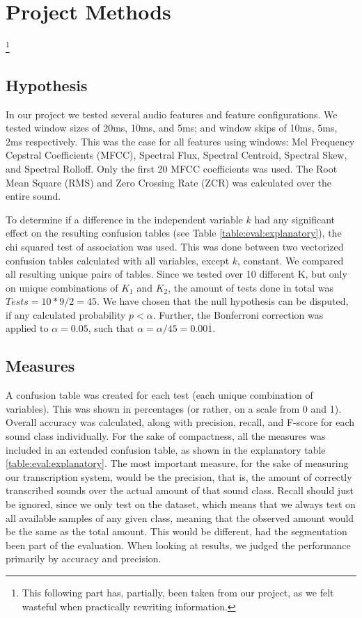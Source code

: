 
\section{Project Methods}\footnote{This following part has, partially, been taken from our project, as we felt wasteful when practically rewriting information.}
	\subsection{Hypothesis}
		In our project we tested several audio features and feature configurations.
		We tested window sizes of 20ms, 10ms, and 5ms; and window skips of 10ms, 5ms, 2ms respectively. This was the case for all features using windows: Mel Frequency Cepstral Coefficients (MFCC), Spectral Flux, Spectral Centroid, Spectral Skew, and Spectral Rolloff. Only the first 20 MFCC coefficients was used. The Root Mean Square (RMS) and Zero Crossing Rate (ZCR) was calculated over the entire sound.
		
		To determine if a difference in the independent variable $k$ had any significant effect on the resulting confusion tables (see Table \ref{table:eval:explanatory}), the chi squared test of association was used. This was done between two vectorized confusion tables calculated with all variables, except $k$, constant. We compared all resulting unique pairs of tables. Since we tested over 10 different K, but only on unique combinations of $K_1$ and $K_2$, the amount of tests done in total was $Tests = 10*9/2 = 45$. We have chosen that the null hypothesis can be disputed, if any calculated probability $p < \alpha$. Further, the Bonferroni correction\citep{bonferroni} was applied to $\alpha=0.05$, such that $\alpha=\alpha/45 = 0.00\overline{1}$.
		
	\subsection{Measures}
		A confusion table was created for each test (each unique combination of variables). This was shown in percentages (or rather, on a scale from 0 and 1). Overall accuracy was calculated, along with precision, recall, and F-score for each sound class individually. For the sake of compactness, all the measures was included in an extended confusion table, as shown in the explanatory table \ref{table:eval:explanatory}. 
		The most important measure, for the sake of measuring our transcription system, would be the precision, that is, the amount of correctly transcribed sounds over the actual amount of that sound class.
		Recall should just be ignored, since we only test on the dataset, which means that we always test on all available samples of any given class, meaning that the observed amount would be the same as the total amount. This would be different, had the segmentation been part of the evaluation. When looking at results, we judged the performance primarily by accuracy and precision.

